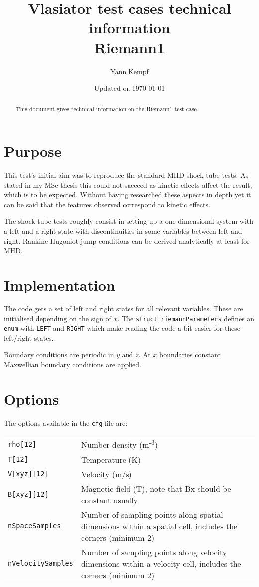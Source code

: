 \documentclass[a4paper,10pt]{scrartcl}
\title{
\Huge{Vlasiator test cases technical information} \\
\LARGE{Riemann1}
}
\author{Yann Kempf}
\date{Updated on \today}
\begin{document}
\maketitle

\begin{abstract}
   This document gives technical information on the Riemann1 test case.
\end{abstract}

\section{Purpose}
This test's initial aim was to reproduce the standard MHD shock tube tests. As stated in my MSc thesis this could not succeed as kinetic effects affect the result, which is to be expected. Without having researched these aspects in depth yet it can be said that the features observed correspond to kinetic effects.

The shock tube tests roughly consist in setting up a one-dimensional system with a left and a right state with discontinuities in some variables between left and right. Rankine-Hugoniot jump conditions can be derived analytically at least for MHD.


\section{Implementation}
The code gets a set of left and right states for all relevant variables. These are initialised depending on the sign of $x$. The \verb=struct riemannParameters= defines an \verb=enum= with \verb=LEFT= and \verb=RIGHT= which make reading the code a bit easier for these left/right states.

Boundary conditions are periodic in $y$ and $z$. At $x$ boundaries constant Maxwellian boundary conditions are applied.

\section{Options}
The options available in the \verb=cfg= file are:

\begin{tabularx}{\textwidth}{lX}
   \verb=rho[12]= & Number density (m\textsuperscript{-3}) \\
   \verb=T[12]= & Temperature (K) \\
   \verb=V[xyz][12]= & Velocity (m/s) \\
   \verb=B[xyz][12]= & Magnetic field (T), note that Bx should be constant usually \\
   \verb=nSpaceSamples= & Number of sampling points along spatial dimensions within a spatial cell, includes the corners (minimum 2) \\
   \verb=nVelocitySamples= & Number of sampling points along velocity dimensions within a velocity cell, includes the corners (minimum 2)
\end{tabularx}
\end{document}
